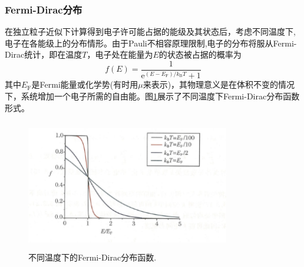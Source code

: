 \subsubsection{Fermi-Dirac分布} 
在独立粒子近似下计算得到电子许可能占据的能级及其状态后，考虑不同温度下,电子在各能级上的分布情形。由于Pauli不相容原理限制,电子的分布将服从Fermi-Dirac统计，即在温度$T$，电子处在能量为$E$的状态被占据的概率为
\begin{equation}
	f(E)=\dfrac1{\mathrm{e}^{(E-E_{\mathrm{F}})/k_{\mathrm{B}}T}+1}
	\label{eq:Fermi_Dirac}
\end{equation}
其中$E_{\mathrm{F}}$是Fermi能量或化学势(有时用$\mu$来表示)，其物理意义是在体积不变的情况下，系统增加一个电子所需的自由能。图\ref{Fig:Fermi-Dirac}展示了不同温度下Fermi-Dirac分布函数形式。
\begin{figure}[h!]
\centering
\vspace*{-0.18in}
\includegraphics[height=2.25in,width=3.5in,viewport=0 0 70 45,clip]{Figures/Fermi-Dirac.png}
\caption{\small \textrm{不同温度下的Fermi-Dirac分布函数.}}%
\label{Fig:Fermi-Dirac}
\end{figure}
